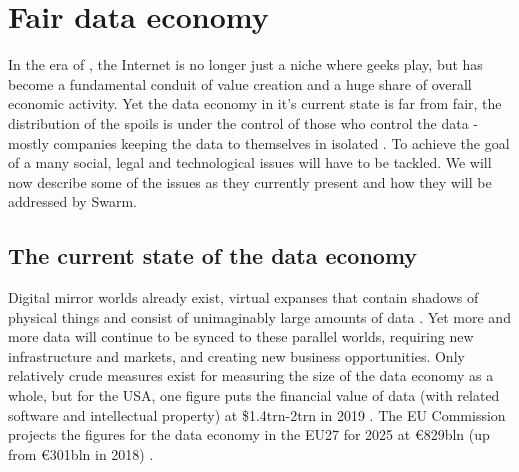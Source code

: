 \section{Fair data economy  \statusgreen}\label{sec:fair-data}
\green{}

In the era of , the Internet is no longer just a niche where geeks play, but has become a fundamental conduit of value creation and a huge share of overall economic activity. Yet the data economy in it's current state is far from fair, the distribution of the spoils is under the control of those who control the data - mostly companies keeping the data to themselves in isolated . To achieve the goal of a  many social, legal and technological issues will have to be tackled. We will now describe some of the issues as they  currently present and how they will be addressed by Swarm. 

\subsection{The current state of the data economy  \statusgreen} \label{sec:dataeconomy}

Digital mirror worlds already exist, virtual expanses that contain shadows of physical things and consist of unimaginably large amounts of data \cite{MirrorWorlds2020Feb}. Yet more and more data will continue to be synced to these parallel worlds, requiring new infrastructure and markets, and creating new business opportunities. Only relatively crude measures exist for measuring the size of the data economy as a whole, but for the USA, one figure puts the financial value of data (with related software and intellectual property) at \$1.4trn-2trn in 2019 \cite{MirrorWorlds2020Feb}. The EU Commission projects the figures for the data economy in the EU27 for 2025 at €829bln (up from €301bln in 2018) \cite{EUDataStrategy2020Feb}. 

